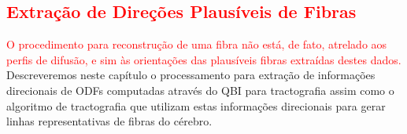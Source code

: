 \documentclass[
    12pt,                %
    oneside,            %
    a4paper,            %
    english,            %
    french,                %
    spanish,            %
    brazil                %
    ]{abntex2}
\begin{document}

\textcolor{red}{\chapter{Extração de Direções Plausíveis de Fibras}}


\textcolor{red}{O procedimento para reconstrução de uma fibra não está, de fato, atrelado aos perfis de difusão, e sim às orientações das plausíveis fibras extraídas destes dados.} Descreveremos neste capítulo o processamento para extração de informações direcionais de ODFs computadas através do QBI para tractografia assim como o algoritmo de tractografia que utilizam estas informações direcionais para gerar linhas representativas de fibras do cérebro.


\end{document}

